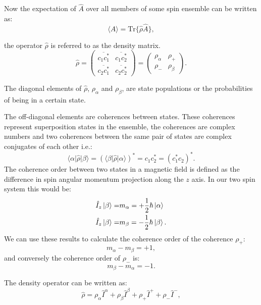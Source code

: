 Now the expectation of $\hat{A}$ over all members of some spin ensemble can be written as:
\begin{equation}
  \langle{A}\rangle = \text{Tr}\{\hat{\rho}\hat{A}\},
\end{equation}

the operator $\hat{\rho}$ is referred to as the density matrix.
\begin{equation}\label{eqn:density}
  \hat{\rho} = \begin{pmatrix}
      \overline{c_1c_1^*} & \overline{c_1c_2^*}\\
      \overline{c_2c_1^*} & \overline{c_2c_2^*}
  \end{pmatrix} = \begin{pmatrix}
      \rho_\alpha & \rho_+\\
      \rho_- & \rho_\beta
  \end{pmatrix}.
\end{equation}

The diagonal elements of $\hat{\rho}$, $\rho_\alpha$ and $\rho_\beta$, are state populations or the probabilities of being in a certain state.

The off-diagonal elements are coherences between states. These coherences represent superposition states in the ensemble,
the coherences are complex numbers and two coherences between the same pair of states are complex conjugates of each other i.e.:
\begin{equation}
  \langle\alpha\vert\hat\rho\vert\beta\rangle = (\langle\beta\vert\hat\rho\vert\alpha\rangle)^* = c_1c_2^* = (c_1^*c_2)^*.
\end{equation}
The coherence order between two states in a magnetic field is defined as the difference in spin angular
momentum projection along the $z$ axis. In our two spin system this would be:
\begin{align}
  \hat{I}_z\ket{\beta} =& m_\alpha = +\frac{1}{2}\hbar\ket{\alpha}\\
  \hat{I}_z\ket{\beta} =& m_\beta = -\frac{1}{2}\hbar\ket{\beta}.
\end{align}
We can use these results to calculate the coherence order of the coherence $\rho_+$:
\begin{equation}
 m_\alpha - m_\beta = +1,
\end{equation}
and conversely the coherence order of $\rho_-$ is:
\begin{equation}
  m_\beta - m_\alpha = -1.
\end{equation}

The density operator can be written as:
\begin{equation}
  \hat{\rho} = \rho_\alpha\hat{I}^\alpha + \rho_\beta\hat{I}^\beta + \rho_+\hat{I}^+ + \rho_-\hat{I}^-,
\end{equation}

